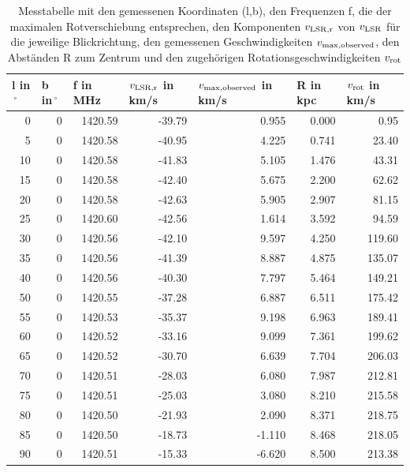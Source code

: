 \begin{table}[h]
\centering
\begin{tabular}{rrrrrrr}
\multicolumn{1}{l}{l in$\,^\circ $} & \multicolumn{1}{l}{b in$\,^\circ $} & \multicolumn{1}{l}{f in MHz} & \multicolumn{1}{l}{$v_{\mathrm{LSR,r}}$ in km/s} & \multicolumn{1}{l}{$v_{\mathrm{max,observed}}$ in km/s} & \multicolumn{1}{l}{R in kpc} & \multicolumn{1}{l}{$v_{\mathrm{rot}}$ in km/s} \\ \midrule
0 & 0 & 1420.59 & -39.79 & 0.955 & 0.000 & 0.95 \\
5 & 0 & 1420.58 & -40.95 & 4.225 & 0.741 & 23.40 \\ 
10 & 0 & 1420.58 & -41.83 & 5.105 & 1.476 & 43.31 \\ 
15 & 0 & 1420.58 & -42.40 & 5.675 & 2.200 & 62.62 \\ 
20 & 0 & 1420.58 & -42.63 & 5.905 & 2.907 & 81.15 \\ 
25 & 0 & 1420.60 & -42.56 & 1.614 & 3.592 & 94.59 \\ 
30 & 0 & 1420.56 & -42.10 & 9.597 & 4.250 & 119.60 \\ 
35 & 0 & 1420.56 & -41.39 & 8.887 & 4.875 & 135.07 \\ 
40 & 0 & 1420.56 & -40.30 & 7.797 & 5.464 & 149.21 \\ 
50 & 0 & 1420.55 & -37.28 & 6.887 & 6.511 & 175.42 \\ 
55 & 0 & 1420.53 & -35.37 & 9.198 & 6.963 & 189.41 \\ 
60 & 0 & 1420.52 & -33.16 & 9.099 & 7.361 & 199.62 \\ 
65 & 0 & 1420.52 & -30.70 & 6.639 & 7.704 & 206.03 \\ 
70 & 0 & 1420.51 & -28.03 & 6.080 & 7.987 & 212.81 \\ 
75 & 0 & 1420.51 & -25.03 & 3.080 & 8.210 & 215.58 \\ 
80 & 0 & 1420.50 & -21.93 & 2.090 & 8.371 & 218.75 \\ 
85 & 0 & 1420.50 & -18.73 & -1.110 & 8.468 & 218.05 \\
90 & 0 & 1420.51 & -15.33 & -6.620 & 8.500 & 213.38 \\
\end{tabular}
\caption{Messtabelle mit den gemessenen Koordinaten (l,b), den Frequenzen f, die der maximalen Rotverschiebung entsprechen, den Komponenten $v_{\mathrm{LSR,r}}$ von $v_{\mathrm{LSR}}$ für die jeweilige Blickrichtung, den gemessenen Geschwindigkeiten $v_{\mathrm{max,observed}}$, den Abständen R zum Zentrum und den zugehörigen Rotationsgeschwindigkeiten $v_{\mathrm{rot}}$ }
\label{tab:Messtabelle}
\end{table}

